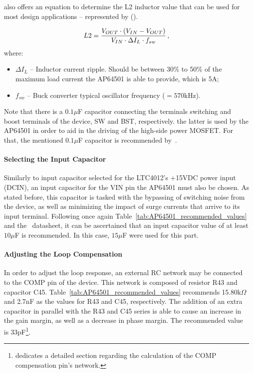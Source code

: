 \cite{AP64501} also offers an equation to determine the L2 inductor value that can be used for most design applications -- represented by (\cite{eq:L2}).

\begin{equation}\label{eq:L2}
	L2 = \frac{V_{OUT} \cdot \left(V_{IN} - V_{OUT}\right)}{V_{IN} \cdot \Delta I_L \cdot f_{sw}}\,,\medskip
\end{equation}
where:
\begin{itemize}
	\item $\Delta I_L$ -- Inductor current ripple. Should be between 30\% to 50\% of the maximum load current the AP64501 is able to provide, which is 5A;
	\item $f_{sw}$ -- Buck converter typical oscillator frequency ($=570$kHz).
\end{itemize}

Note that there is a $0.1 \mu$F capacitor connecting the terminals switching and boost terminals of the device, SW and BST, respectively. the latter is used by the AP64501 in order to aid in the driving of the high-side power MOSFET. For that, the mentioned $0.1 \mu$F capacitor is recommended by~\cite{AP64501}.

\paragraph{Selecting the Input Capacitor}	Similarly to input capacitor selected for the LTC4012's +15VDC power input (DCIN), an input capacitor for the VIN pin the AP64501 must also be chosen. As stated before, this capacitor is tasked with the bypassing of switching noise from the device, as well as minimizing the impact of surge currents that arrive to its input terminal. Following once again Table~\ref{tab:AP64501_recommended_values} and the~\cite{AP64501} datasheet, it can be ascertained that an input capacitor value of at least $10 \mu$F is recommended. In this case, $15 \mu$F were used for this part.

\paragraph{Adjusting the Loop Compensation}	In order to adjust the loop response, an external RC network may be connected to the COMP pin of the device. This network is composed of resistor R43 and capacitor C45. Table~\ref{tab:AP64501_recommended_values} recommends 15.80k$\Omega$ and 2.7nF as the values for R43 and C45, respectively. The addition of an extra capacitor in parallel with the R43 and C45 series is able to cause an increase in the gain margin, as well as a decrease in phase margin. The recommended value is 33pF\footnote[12]{\cite{AP64501} dedicates a detailed section regarding the calculation of the COMP compensation pin's network.}.

